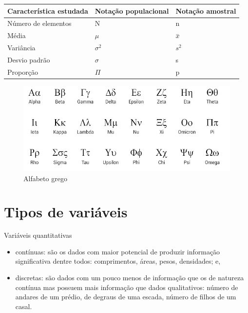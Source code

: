 \documentclass[
]{book}
\providecommand{\tightlist}{%
  \setlength{\itemsep}{0pt}\setlength{\parskip}{0pt}}
\begin{document}
\begin{longtable}[]{@{}lll@{}}
\toprule()
Característica estudada & Notação populacional & Notação amostral \\
\midrule()
\endhead
Número de elementos & N & n \\
Média & \(\mu\) & \(\stackrel{-}{x}\) \\
Variância & \(\sigma^{2}\) & \({s}^{2}\) \\
Desvio padrão & \(\sigma\) & s \\
Proporção & \(\Pi\) & p \\
\bottomrule()
\end{longtable}

\begin{figure}

{\centering \includegraphics[width=1\linewidth]{images2/alf_grego} 

}

\caption{Alfabeto grego}\label{fig:unnamed-chunk-6}
\end{figure}

\hypertarget{tipos-de-variuxe1veis}{%
\section{Tipos de variáveis}\label{tipos-de-variuxe1veis}}

Variáveis quantitativas

\begin{itemize}
\tightlist
\item
  contínuas: são os dados com maior potencial de produzir informação significativa dentre todos: comprimentos, áreas, pesos, densidades; e,
\item
  discretas: são dados com um pouco menos de informação que os de natureza contínua mas possuem mais informação que dados qualitativos: número de andares de um prédio, de degraus de uma escada, número de filhos de um casal.
\end{itemize}
\end{document}
